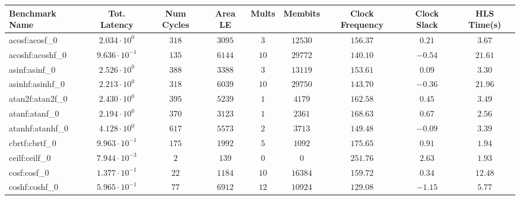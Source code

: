 \begin{tabular}{|l|c|c|c|c|c|c|c|c|}
\hline
Benchmark Name               & Tot. Latency            & Num Cycles & Area LE    & Mults   & Membits    & Clock Frequency & Clock Slack & HLS Time(s) \\
\hline
acosf:acosf\_0               & $ 2.034 \cdot 10^{0}  $ & $ 318    $ & $ 3095   $ & $ 3   $ & $ 12530  $ & $ 156.37      $ & $ 0.21    $ & $ 3.67    $ \\
acoshf:acoshf\_0             & $ 9.636 \cdot 10^{-1} $ & $ 135    $ & $ 6144   $ & $ 10  $ & $ 29772  $ & $ 140.10      $ & $ -0.54   $ & $ 21.61   $ \\
asinf:asinf\_0               & $ 2.526 \cdot 10^{0}  $ & $ 388    $ & $ 3388   $ & $ 3   $ & $ 13119  $ & $ 153.61      $ & $ 0.09    $ & $ 3.30    $ \\
asinhf:asinhf\_0             & $ 2.213 \cdot 10^{0}  $ & $ 318    $ & $ 6039   $ & $ 10  $ & $ 29750  $ & $ 143.70      $ & $ -0.36   $ & $ 21.96   $ \\
atan2f:atan2f\_0             & $ 2.430 \cdot 10^{0}  $ & $ 395    $ & $ 5239   $ & $ 1   $ & $ 4179   $ & $ 162.58      $ & $ 0.45    $ & $ 3.49    $ \\
atanf:atanf\_0               & $ 2.194 \cdot 10^{0}  $ & $ 370    $ & $ 3123   $ & $ 1   $ & $ 2361   $ & $ 168.63      $ & $ 0.67    $ & $ 2.56    $ \\
atanhf:atanhf\_0             & $ 4.128 \cdot 10^{0}  $ & $ 617    $ & $ 5573   $ & $ 2   $ & $ 3713   $ & $ 149.48      $ & $ -0.09   $ & $ 3.39    $ \\
cbrtf:cbrtf\_0               & $ 9.963 \cdot 10^{-1} $ & $ 175    $ & $ 1992   $ & $ 5   $ & $ 1092   $ & $ 175.65      $ & $ 0.91    $ & $ 1.94    $ \\
ceilf:ceilf\_0               & $ 7.944 \cdot 10^{-3} $ & $ 2      $ & $ 139    $ & $ 0   $ & $ 0      $ & $ 251.76      $ & $ 2.63    $ & $ 1.93    $ \\
cosf:cosf\_0                 & $ 1.377 \cdot 10^{-1} $ & $ 22     $ & $ 1184   $ & $ 10  $ & $ 16384  $ & $ 159.72      $ & $ 0.34    $ & $ 12.48   $ \\
coshf:coshf\_0               & $ 5.965 \cdot 10^{-1} $ & $ 77     $ & $ 6912   $ & $ 12  $ & $ 10924  $ & $ 129.08      $ & $ -1.15   $ & $ 5.77    $ \\

\end{tabular}
